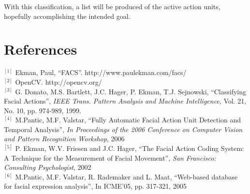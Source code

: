 \documentclass[12pt,a4paper]{scrartcl}
\begin{document}
	With this classification, a list will be produced of the active action units, hopefully accomplishing the intended goal.
	
	\section{References}
	$^{[1]}$ Ekman, Paul, “FACS”. http://www.paulekman.com/facs/ \\
	$^{[2]}$ OpenCV. http://opencv.org/ \\
	$^{[3]}$ G. Donato, M.S. Bartlett, J.C. Hager, P. Ekman, T.J. Sejnowski,
“Classifying Facial Actions”, \textit{IEEE Trans. Pattern Analysis and
Machine Intelligence}, Vol. 21, No. 10, pp. 974-989, 1999.  \\
	$^{[4]}$ M.Pantic, M.F. Valstar, “Fully Automatic Facial Action Unit Detection and Temporal Analysis”, \textit{In Proceedings of the 2006 Conference on Computer Vision and Pattern Recognition Workshop}, 2006 \\
	$^{[5]}$ P. Ekman, W.V. Friesen and J.C. Hager, “The Facial Action Coding
System: A Technique for the Measurement of Facial Movement”, \textit{San Francisco: Consulting Psychologist}, 2002 \\
	$^{[6]}$ M.Pantic, M.F. Valstar, R. Rademaker and L. Maat, “Web-based database for facial expression analysis”, In ICME’05, pp. 317-321, 2005 \\
\end{document}
